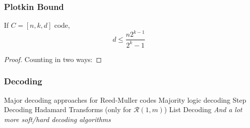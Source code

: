 \documentclass{beamer}
\newcommand{\RM}[2]{\ensuremath{\mathcal{R}(#1,#2)}}
\newcommand{\rem}{Reed-Muller}
\begin{document}

\begin{frame}
 \frametitle{Plotkin Bound}

\begin{theorem}
    If $C = [n,k,d]$ code, \begin{equation*}
d \leq \frac{n2^{k-1}}{2^k - 1}
\end{equation*}
  \begin{proof}
Counting in two ways:
\end{proof}
\end{theorem}


\end{frame}



\begin{frame}
\frametitle{Decoding}
Major decoding approaches for \rem{} codes
Majority logic decoding
Step Decoding
Hadamard Transforms (only for $\RM{1}{m}$)
List Decoding 
\emph{And a lot more soft/hard decoding algorithms}
\end{frame}

\end{document}
